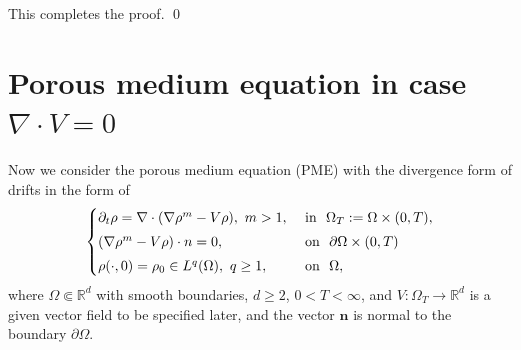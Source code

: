 \documentclass{amsart}
\numberwithin{equation}{section}
\newcommand{\bbr}{{ \mathbb{R}  }}
\begin{document}
This completes the proof. \qed





\section{Porous medium equation in case $\nabla \cdot V = 0$}\label{Appendix:PME}

Now we consider the porous medium equation (PME) with the divergence form of drifts in the form of 
\begin{equation}\label{E:PME}
\begin{cases}
\partial_t \rho =   \nabla \cdot( \nabla \rho^m  - V\rho), \ m>1,  & \text{ in } \  \Omega_{T}:= \Omega \times (0, T), \vspace{1 mm}\\
 \left( \nabla \rho^m - V\rho \right)\cdot \textbf{n} = 0 , &\text{ on } \ \partial \Omega \times (0, T) \vspace{1mm} \\
 \rho(\cdot,0)=\rho_0 \in L^q (\Omega), \ q\geq 1, & \text{ on } \ \Omega,
\end{cases}
\end{equation}
where $\Omega \Subset \bbr^d$ with smooth boundaries, $d\geq 2$, $0 <T < \infty$, and $V: \Omega_{T} \to \mathbb{R}^d$ is a given vector field to be specified later, and the vector $\textbf{n}$ is normal to the boundary $\partial \Omega$. 
\end{document}
